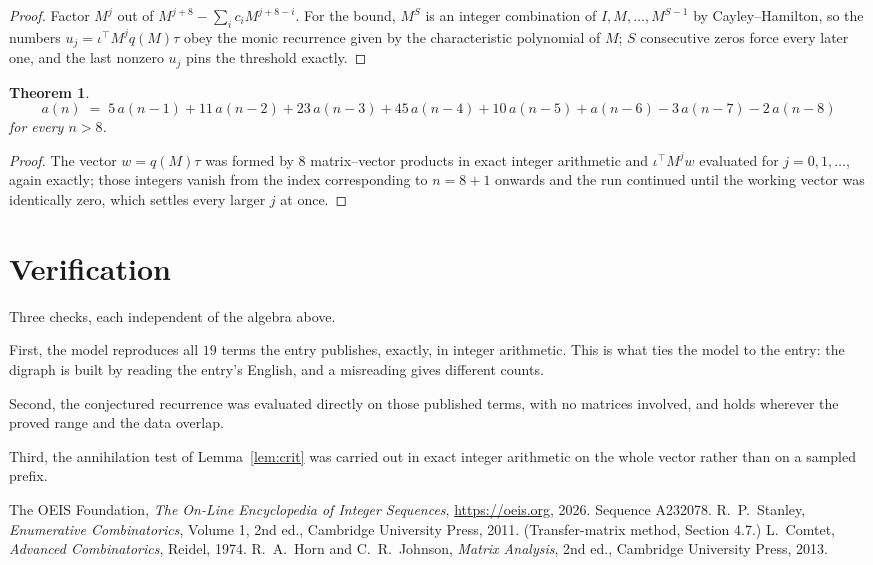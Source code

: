\documentclass[11pt,a4paper]{article}
\theoremstyle{plain}
\newtheorem{theorem}{Theorem}
\theoremstyle{definition}
\begin{document}
\begin{proof}
Factor $M^{j}$ out of $M^{j+8}-\sum_ic_iM^{j+8-i}$. For the bound, $M^{S}$
is an integer combination of $I,M,\dots,M^{S-1}$ by Cayley--Hamilton, so the numbers
$u_j=\iota^{\!\top}M^{j}q(M)\tau$ obey the monic recurrence given by the characteristic
polynomial of $M$; $S$ consecutive zeros force every later one, and the last nonzero $u_j$
pins the threshold exactly.
\end{proof}

\begin{theorem}
\[
a(n)\;=\;5\,a(n-1) + 11\,a(n-2) + 23\,a(n-3) + 45\,a(n-4) + 10\,a(n-5) + a(n-6) - 3\,a(n-7) - 2\,a(n-8)
\]
for every $n>8$.
\end{theorem}

\begin{proof}
The vector $w=q(M)\tau$ was formed by $8$ matrix--vector products in exact integer
arithmetic and $\iota^{\!\top}M^{j}w$ evaluated for $j=0,1,\dots$, again exactly; those
integers vanish from the index corresponding to $n=8+1$ onwards and the run continued
until the working vector was identically zero, which settles every larger $j$ at once.
\end{proof}

\section{Verification}

Three checks, each independent of the algebra above.

First, the model reproduces all $19$ terms the entry publishes, exactly, in integer
arithmetic. This is what ties the model to the entry: the digraph is built by reading the
entry's English, and a misreading gives different counts.

Second, the conjectured recurrence was evaluated directly on those published terms, with no
matrices involved, and holds wherever the proved range and the data overlap.

Third, the annihilation test of Lemma~\ref{lem:crit} was carried out in exact integer
arithmetic on the whole vector rather than on a sampled prefix.

\begin{thebibliography}{9}
 The OEIS Foundation, \emph{The On-Line Encyclopedia of Integer
Sequences}, \url{https://oeis.org}, 2026. Sequence A232078.
 R.~P.~Stanley, \emph{Enumerative Combinatorics}, Volume 1, 2nd ed.,
Cambridge University Press, 2011. (Transfer-matrix method, Section 4.7.)
 L.~Comtet, \emph{Advanced Combinatorics}, Reidel, 1974.
 R.~A.~Horn and C.~R.~Johnson, \emph{Matrix Analysis}, 2nd ed., Cambridge
University Press, 2013.
\end{thebibliography}
\end{document}
